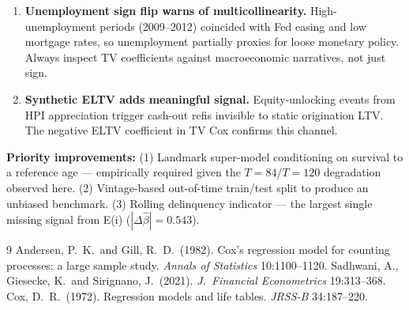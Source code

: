 \documentclass[11pt,a4paper]{article}
\begin{document}
\begin{enumerate}[leftmargin=1.6em,itemsep=3pt]
  \item \textbf{Unemployment sign flip warns of multicollinearity.}
        High-unemployment periods (2009--2012) coincided with Fed easing and low mortgage rates,
        so unemployment partially proxies for loose monetary policy. Always inspect TV
        coefficients against macroeconomic narratives, not just sign.

  \item \textbf{Synthetic ELTV adds meaningful signal.}
        Equity-unlocking events from HPI appreciation trigger cash-out refis invisible to
        static origination LTV. The negative ELTV coefficient in TV Cox confirms this channel.

\end{enumerate}

\vspace{0.5em}
\textbf{Priority improvements:}
(1) Landmark super-model conditioning on survival to a reference age --- empirically required
    given the $T=84$/$T=120$ degradation observed here.
(2) Vintage-based out-of-time train/test split to produce an unbiased benchmark.
(3) Rolling delinquency indicator --- the largest single missing signal from E(i) ($|\Delta\hat\beta| = 0.543$).

\begin{thebibliography}{9}
\small
{}Andersen, P.\ K.\ and Gill, R.\ D.\ (1982). Cox's regression model for counting processes: a large sample study. \textit{Annals of Statistics} 10:1100--1120.
Sadhwani, A., Giesecke, K.\ and Sirignano, J.\ (2021). \textit{J.\ Financial Econometrics} 19:313--368.
Cox, D.\ R.\ (1972). Regression models and life tables. \textit{JRSS-B} 34:187--220.
\end{thebibliography}
\end{document}
